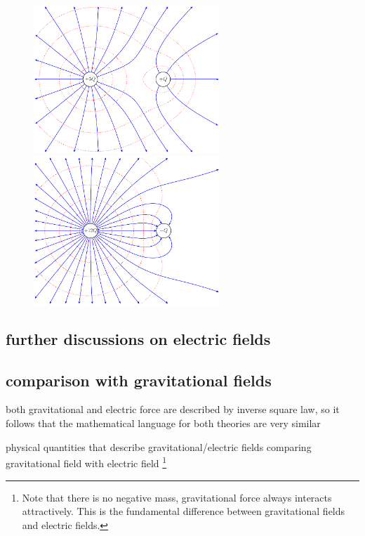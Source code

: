 \begin{figure}	
	\noindent\begin{minipage}{0.48\textwidth}	
		\begin{center}	
			\includegraphics[width=7cm]{Q5p.pdf}
		\end{center}
	\end{minipage}\hfill
	\begin{minipage}{0.48\textwidth}
		\begin{center}
			\includegraphics[width=7cm]{Q12n.pdf}
		\end{center}	
	\end{minipage}
\end{figure}



\subsection{further discussions on electric fields}

\subsection{comparison with gravitational fields}

both gravitational and electric force are described by inverse square law, so it follows that the mathematical language for both theories are very similar

\cmt physical quantities that describe gravitational/electric fields
\cmt comparing gravitational field with electric field
\footnote{Note that there is no negative mass, gravitational force always interacts attractively. This is the fundamental difference between gravitational fields and electric fields.}

